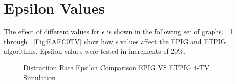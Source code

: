 \documentclass[12pt]{thesis}
\begin{document}
\section{Epsilon Values}
The effect of different values for $\epsilon$ is shown in the following set of graphs. \figurename~\ref{Fig:DREC4TV} through \figurename~\ref{Fig:EAEC0TV} show how $\epsilon$ values affect the EPIG and ETPIG algorithms. Epsilon values were tested in increments of 20\%.
\begin{figure}
	\begin{center}
		\hfill
		
		\hfill
	\end{center}
	\caption{Distraction Rate Epsilon Comparison EPIG VS ETPIG 4-TV Simulation}
	\label{Fig:DREC4TV}
\end{figure}
\end{document}
